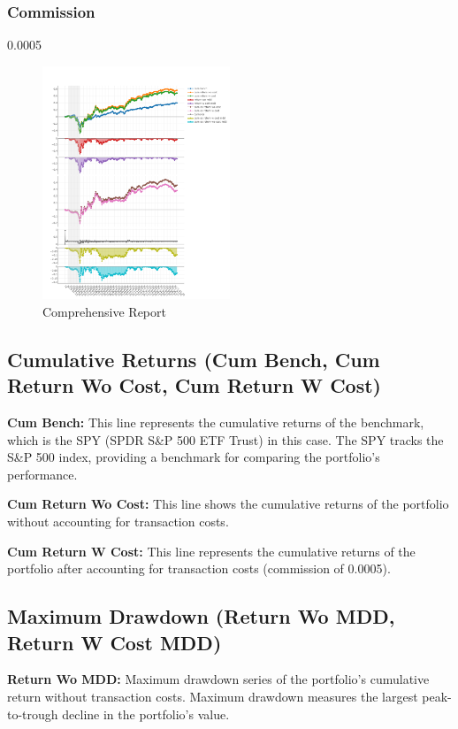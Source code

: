 \documentclass[conference]{IEEEtran}
\begin{document}
\subsubsection*{\textbf{Commission}}
0.0005

\begin{figure}[h!]
\centering
\includegraphics[width=0.5\textwidth]{plot_0.png}
\caption{Comprehensive Report}
\label{fig:comprehensive report}
\end{figure}

\subsection*{\textbf{Cumulative Returns (Cum Bench, Cum Return Wo Cost, Cum Return W Cost)}}

\textbf{Cum Bench:}
This line represents the cumulative returns of the benchmark, which is the SPY (SPDR S\&P 500 ETF Trust) in this case. The SPY tracks the S\&P 500 index, providing a benchmark for comparing the portfolio's performance.

\textbf{Cum Return Wo Cost:}
This line shows the cumulative returns of the portfolio without accounting for transaction costs.

\textbf{Cum Return W Cost:}
This line represents the cumulative returns of the portfolio after accounting for transaction costs (commission of 0.0005).

\subsection*{\textbf{Maximum Drawdown (Return Wo MDD, Return W Cost MDD)}}
\textbf{Return Wo MDD:}
Maximum drawdown series of the portfolio's cumulative return without transaction costs. Maximum drawdown measures the largest peak-to-trough decline in the portfolio's value.
\end{document}
